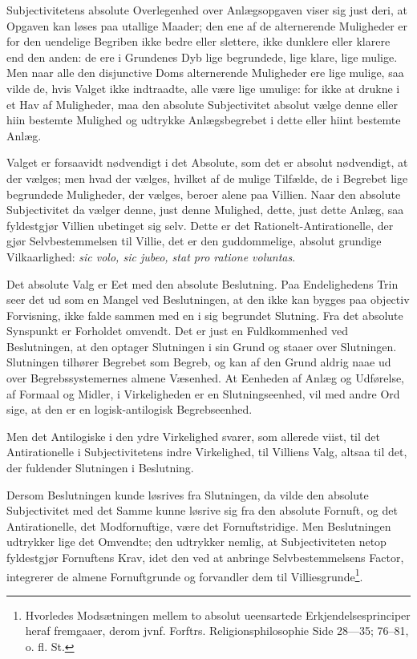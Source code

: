 \documentclass[12pt]{book}
\newcommand{\opage}[1]{\marginnote{\footnotesize\textit{[#1]}}}
\begin{document}
Subjectivitetens absolute Overlegenhed over Anlægsopgaven viser sig
just deri, at Opgaven kan løses paa utallige Maader; den ene af de
alternerende Muligheder er for den uendelige Begriben ikke bedre
eller slettere, ikke dunklere eller klarere end den anden: de ere i
Grundenes Dyb lige begrundede, lige klare, lige mulige. Men naar
alle den disjunctive Doms alternerende Muligheder ere lige mulige,
saa vilde de, hvis Valget ikke indtraadte, alle være lige umulige:
for ikke at drukne i et Hav af Muligheder, maa den absolute
Subjectivitet absolut vælge denne eller hiin bestemte Mulighed og
udtrykke Anlægsbegrebet i dette eller hiint bestemte Anlæg.

Valget er forsaavidt nødvendigt i det Absolute, som det er absolut
nødvendigt, at der vælges; men hvad der vælges, hvilket af de mulige
Tilfælde, de i Begrebet lige begrundede Muligheder, der vælges,
beroer alene paa Villien. Naar den absolute Subjectivitet da vælger
denne, just denne Mulighed, dette, just dette Anlæg, saa fyldestgjør
Villien ubetinget sig selv. Dette er det Rationelt-Antirationelle,
der gjør Selvbestemmelsen til Villie, det er den guddommelige,
absolut grundige Vilkaarlighed: \textit{sic volo, sic jubeo, stat
pro ratione voluntas}.

Det absolute Valg er Eet med den absolute Beslutning. Paa
Endelighedens Trin seer det ud som en Mangel ved Beslutningen, at
den ikke kan bygges paa objectiv Forvisning, ikke falde sammen med
en i sig begrundet Slutning. Fra det absolute Synspunkt er Forholdet
omvendt. Det er just en Fuldkommenhed ved Beslutningen, at den
optager Slutningen i sin Grund og staaer over Slutningen. Slutningen
tilhører Begrebet som Begreb, og kan af den
\opage{61} Grund aldrig naae ud over Begrebssystemernes almene Væsenhed. At
Eenheden af Anlæg og Udførelse, af Formaal og Midler, i
Virkeligheden er en Slutningseenhed, vil med andre Ord sige, at den
er en logisk-antilogisk Begrebseenhed.

Men det Antilogiske i den ydre Virkelighed svarer, som allerede
viist, til det Antirationelle i Subjectivitetens indre Virkelighed,
til Villiens Valg, altsaa til det, der fuldender Slutningen i
Beslutning.

Dersom Beslutningen kunde løsrives fra Slutningen, da vilde den
absolute Subjectivitet med det Samme kunne løsrive sig fra den
absolute Fornuft, og det Antirationelle, det Modfornuftige, være det
Fornuftstridige. Men Beslutningen udtrykker lige det Omvendte; den
udtrykker nemlig, at Subjectiviteten netop fyldestgjør Fornuftens
Krav, idet den ved at anbringe Selvbestemmelsens Factor, integrerer
de almene Fornuftgrunde og forvandler dem til
Villiesgrunde\footnote{Hvorledes Modsætningen mellem to absolut
ueensartede Erkjendelsesprinciper heraf fremgaaer, derom jvnf.
Forftrs. Religionsphilosophie Side 28---35; 76--81, o. fl. St.}.
\end{document}
